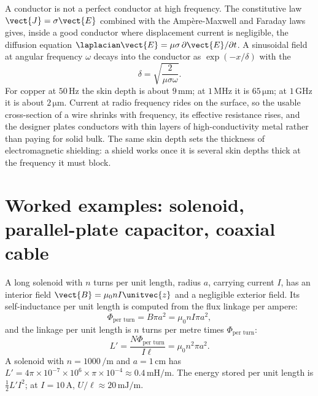 \begin{mastery}
A conductor is not a perfect conductor at high frequency. The
constitutive law $\vect{J} = \sigma\vect{E}$ combined with the
Amp\`ere-Maxwell and Faraday laws gives, inside a good conductor where
displacement current is negligible, the diffusion equation
$\laplacian\vect{E} = \mu\sigma\,\partial\vect{E}/\partial t$. A
sinusoidal field at angular frequency $\omega$ decays into the conductor
as $\exp(-x/\delta)$ with the 
\[
\delta = \sqrt{\frac{2}{\mu\sigma\omega}}.
\]
For copper at $50\,\si{\hertz}$ the skin depth is about $9\,\si{\milli
\meter}$; at $1\,\si{\mega\hertz}$ it is $65\,\si{\micro\meter}$; at
$1\,\si{\giga\hertz}$ it is about $2\,\si{\micro\meter}$. Current at
radio frequency rides on the surface, so the usable cross-section of a
wire shrinks with frequency, its effective resistance rises, and the
designer plates conductors with thin layers of high-conductivity metal
rather than paying for solid bulk. The same skin depth sets the
thickness of electromagnetic shielding: a shield works once it is
several skin depths thick at the frequency it must block.
\end{mastery}

\section{Worked examples: solenoid, parallel-plate capacitor, coaxial cable}

A long solenoid with $n$ turns per unit length, radius $a$, carrying
current $I$, has an interior field $\vect{B} = \mu_{0} n I\unitvec{z}$
and a negligible exterior field. Its self-inductance per unit length
is computed from the flux linkage per ampere:
\[
\Phi_{\text{per turn}} = B\pi a^{2} = \mu_{0} n I \pi a^{2},
\]
and the linkage per unit length is $n$ turns per metre times
$\Phi_{\text{per turn}}$:
\[
L' = \frac{N\Phi_{\text{per turn}}}{I\ell} = \mu_{0} n^{2} \pi a^{2}.
\]
A solenoid with $n = 1000\,\si{\per\meter}$ and $a = 1\,\si{\centi
\meter}$ has $L' = 4\pi\times 10^{-7}\times 10^{6}\times \pi\times
10^{-4} \approx 0.4\,\si{\milli\henry\per\meter}$. The energy stored
per unit length is $\tfrac{1}{2}L' I^{2}$; at $I = 10\,\si{\ampere}$,
$U/\ell \approx 20\,\si{\milli\joule\per\meter}$.



